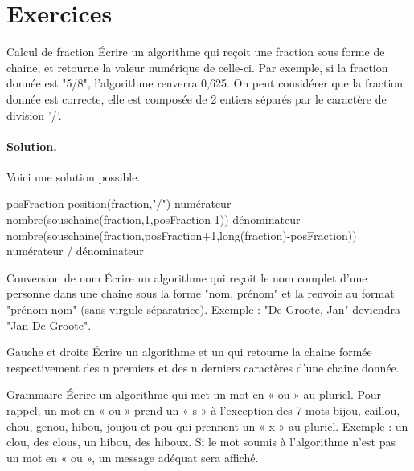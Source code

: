 \section{Exercices}

	\begin{Exercice}{Calcul de fraction}
		Écrire un algorithme 
		qui reçoit une fraction sous forme de chaine, 
		et retourne la valeur numérique de celle-ci. 
		Par exemple, si la fraction donnée est "5/8", 
		l'algorithme renverra 0,625. 
		On peut considérer que la fraction donnée est correcte, 
		elle est composée de 2 entiers séparés 
		par le caractère de division '/'.
		
		\paragraph{Solution.}
		Voici une solution possible.
		\begin{LDA}
				\Let posFraction \Gets position(fraction,"/")
				\Let numérateur \Gets nombre(souschaine(fraction,1,posFraction-1))
				\Let dénominateur \Gets nombre(souschaine(fraction,posFraction+1,long(fraction)-posFraction))
				\Return numérateur / dénominateur
			\EndAlgo
		\end{LDA}
	\end{Exercice}
	
	\begin{Exercice}{Conversion de nom}
		Écrire un algorithme 
		qui reçoit le nom complet d'une personne 
		dans une chaine sous la forme "nom, prénom" 
		et la renvoie au format "prénom nom" 
		(sans virgule séparatrice). 
		Exemple : "De Groote, Jan" deviendra "Jan De Groote".	
	\end{Exercice}
	
	\begin{Exercice}{Gauche et droite}
		Écrire un algorithme  
		et un 
		qui retourne la chaine formée respectivement 
		des n premiers et des n derniers caractères d'une chaine donnée.	
	\end{Exercice}
	
	\begin{Exercice}{Grammaire}
		Écrire un algorithme 
		qui met un mot en « ou » au pluriel. 
		Pour rappel, 
		un mot en « ou » prend un « s » à l'exception des 7 mots 
		bijou, caillou, chou, genou, hibou, joujou et pou qui prennent 
		un « x » au pluriel. 
		Exemple : un clou, des clous, un hibou, des hiboux. 
		Si le mot soumis à l'algorithme n'est pas un mot en « ou », 
		un message adéquat sera affiché.
	\end{Exercice}

